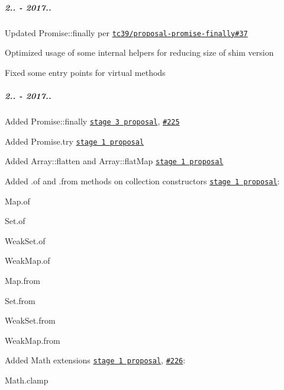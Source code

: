 \subparagraph*{2.. -\/ 2017..}


\begin{DoxyItemize}
\item Updated {\ttfamily Promise\+::finally} per \href{https://github.com/tc39/proposal-promise-finally/issues/37}{\tt tc39/proposal-\/promise-\/finally\#37}
\item Optimized usage of some internal helpers for reducing size of {\ttfamily shim} version
\item Fixed some entry points for virtual methods
\end{DoxyItemize}

\subparagraph*{2.. -\/ 2017..}


\begin{DoxyItemize}
\item Added {\ttfamily Promise\+::finally} \href{https://github.com/tc39/proposal-promise-finally}{\tt stage 3 proposal}, \href{https://github.com/zloirock/core-js/issues/225}{\tt \#225}
\item Added {\ttfamily Promise.\+try} \href{https://github.com/tc39/proposal-promise-try}{\tt stage 1 proposal}
\item Added {\ttfamily Array\+::flatten} and {\ttfamily Array\+::flat\+Map} \href{https://tc39.github.io/proposal-flatMap}{\tt stage 1 proposal}
\item Added {\ttfamily .of} and {\ttfamily .from} methods on collection constructors \href{https://github.com/tc39/proposal-setmap-offrom}{\tt stage 1 proposal}\+:
\begin{DoxyItemize}
\item {\ttfamily Map.\+of}
\item {\ttfamily Set.\+of}
\item {\ttfamily Weak\+Set.\+of}
\item {\ttfamily Weak\+Map.\+of}
\item {\ttfamily Map.\+from}
\item {\ttfamily Set.\+from}
\item {\ttfamily Weak\+Set.\+from}
\item {\ttfamily Weak\+Map.\+from}
\end{DoxyItemize}
\item Added {\ttfamily Math} extensions \href{https://github.com/rwaldron/proposal-math-extensions}{\tt stage 1 proposal}, \href{https://github.com/zloirock/core-js/issues/226}{\tt \#226}\+:
\begin{DoxyItemize}
\item {\ttfamily Math.\+clamp}

\end{DoxyItemize}
\end{DoxyItemize}
